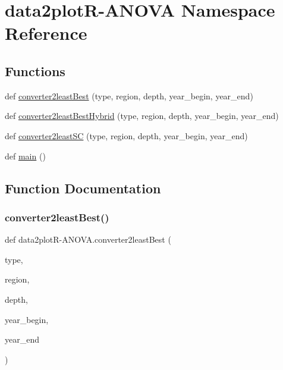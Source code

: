 \hypertarget{namespacedata2plot_r-_a_n_o_v_a}{}\section{data2plot\+R-\/\+A\+N\+O\+VA Namespace Reference}
\label{namespacedata2plot_r-_a_n_o_v_a}
\subsection*{Functions}
\begin{DoxyCompactItemize}
\item 
def \hyperlink{namespacedata2plot_r-_a_n_o_v_a_a76036bef0ed96408db0b5384fb68c280}{converter2least\+Best} (type, region, depth, year\+\_\+begin, year\+\_\+end)
\item 
def \hyperlink{namespacedata2plot_r-_a_n_o_v_a_a52bf879d3542185ef4d184db239b9085}{converter2least\+Best\+Hybrid} (type, region, depth, year\+\_\+begin, year\+\_\+end)
\item 
def \hyperlink{namespacedata2plot_r-_a_n_o_v_a_ab61a4a03e766a1cebbe27e57446b042e}{converter2least\+SC} (type, region, depth, year\+\_\+begin, year\+\_\+end)
\item 
def \hyperlink{namespacedata2plot_r-_a_n_o_v_a_ab3d02ce013a6854a4157d2b785dd4039}{main} ()
\end{DoxyCompactItemize}


\subsection{Function Documentation}
\mbox{\label{namespacedata2plot_r-_a_n_o_v_a_a76036bef0ed96408db0b5384fb68c280}} 
\subsubsection{\texorpdfstring{converter2least\+Best()}{converter2leastBest()}}
{\footnotesize\ttfamily def data2plotR-\/A\+N\+O\+V\+A.\+converter2least\+Best (\begin{DoxyParamCaption}\item[{}]{type,  }\item[{}]{region,  }\item[{}]{depth,  }\item[{}]{year\+\_\+begin,  }\item[{}]{year\+\_\+end }\end{DoxyParamCaption})}

